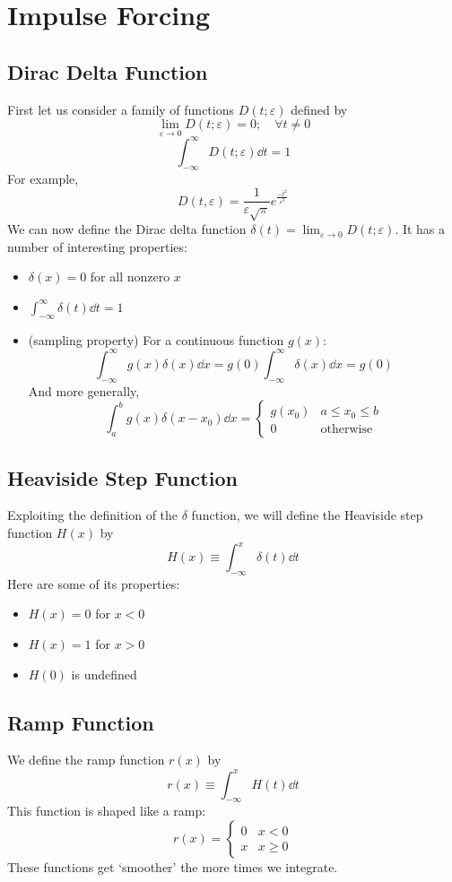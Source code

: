 \documentclass{article}
\begin{document}
\section{Impulse Forcing}
\subsection{Dirac Delta Function}
First let us consider a family of functions $D(t; \varepsilon)$ defined by
\[ \lim_{\varepsilon \to 0} D(t; \varepsilon) = 0;\quad\forall t \neq 0 \]
\[ \int_{-\infty}^\infty D(t;\varepsilon) \dd{t} = 1 \]
For example,
\[ D(t, \varepsilon) = \frac{1}{\varepsilon\sqrt{\pi}}e^{\frac{-t^2}{\varepsilon^2}} \]
We can now define the Dirac delta function $\delta(t) = \lim_{\varepsilon \to 0} D(t; \varepsilon)$. It has a number of interesting properties:
\begin{itemize}
    \item $\delta(x) = 0$ for all nonzero $x$
    \item $\int_{-\infty}^\infty \delta(t) \dd{t} = 1$
    \item (sampling property) For a continuous function $g(x)$:
          \[ \int_{-\infty}^\infty g(x)\delta(x) \dd{x} = g(0)\int_{-\infty}^\infty \delta(x) \dd{x} = g(0) \]
          And more generally,
          \[ \int_a^b g(x)\delta(x-x_0) \dd{x} = \begin{cases}
                  g(x_0) & a \leq x_0 \leq b \\
                  0      & \text{otherwise}
              \end{cases} \]
\end{itemize}

\subsection{Heaviside Step Function}
Exploiting the definition of the $\delta$ function, we will define the Heaviside step function $H(x)$ by
\[ H(x) \equiv \int_{-\infty}^x \delta(t) \dd{t} \]
Here are some of its properties:
\begin{itemize}
    \item $H(x) = 0$ for $x < 0$
    \item $H(x) = 1$ for $x > 0$
    \item $H(0)$ is undefined
\end{itemize}

\subsection{Ramp Function}
We define the ramp function $r(x)$ by
\[ r(x) \equiv \int_{-\infty}^x H(t) \dd{t} \]
This function is shaped like a ramp:
\[ r(x) = \begin{cases}
        0 & x < 0    \\
        x & x \geq 0
    \end{cases} \]
These functions get `smoother' the more times we integrate.
\end{document}
